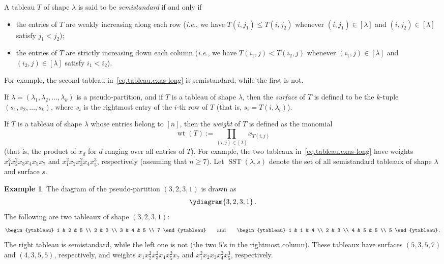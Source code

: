 \documentclass[reqno]{amsart}
\newcommand{\0}{\phantom{c}}
\newcommand{\diag}[1]{\left[#1\right]} %
\DeclareMathOperator{\wt}{wt} %
\DeclareMathOperator{\SST}{SST} %
\let\prodnonlimits\prod
\renewcommand{\prod}{\prodnonlimits\limits}
\newenvironment{verlong}{}{}
\newcommand{\tup}[1]{\left( #1 \right)}
\newcommand{\ive}[1]{\left[ #1 \right]}
\newcommand{\defn}[1]{{\color{darkred}\emph{#1}}} %
\theoremstyle{plain}
\theoremstyle{definition}
\newtheorem{example}[thm]{Example}
\numberwithin{equation}{section}
\begin{document}
A tableau $T$ of shape $\lambda$ is said to be \defn{semistandard} if and only if
\begin{itemize}
\item the entries of $T$ are weakly increasing along each row (\textit{i.e.}, we have $T(i,j_1) \leq T(i,j_2)$ whenever $(i,j_1) \in \diag{\lambda}$ and $(i,j_2) \in \diag{\lambda}$ satisfy $j_1 < j_2$);

\item the entries of $T$ are strictly increasing down each column (\textit{i.e.}, we have $T(i_1,j) < T(i_2,j)$ whenever $(i_1,j) \in \diag{\lambda}$ and $(i_2,j) \in \diag{\lambda}$ satisfy $i_1 < i_2$).
\end{itemize}

\begin{verlong}
For example, the second tableau in~\eqref{eq.tableau.exas-long} is semistandard, while the first is not.
\end{verlong}

If $\lambda = \tup{\lambda_1, \lambda_2, \dotsc, \lambda_k}$ is a pseudo-partition, and if $T$ is a tableau of shape $\lambda$,
then the \defn{surface} of $T$ is defined to be the $k$-tuple $(s_1, s_2, \dotsc, s_k)$, where $s_i$ is the rightmost entry of the $i$-th row of $T$ (that is, $s_i = T(i,\lambda_i)$).

If $T$ is a tableau of shape $\lambda$ whose entries belong to $\ive{n}$, then the \defn{weight} of $T$ is defined as the monomial
\[
\wt(T) := \prod_{(i,j) \in \diag{\lambda}} x_{T(i,j)}
\]
(that is, the product of $x_{d}$ for $d$ ranging over all entries of $T$).
\begin{verlong}
For example, the two tableaux in~\eqref{eq.tableau.exas-long} have weights $x_1^{3}x_2^{2}x_{3}x_{4}x_{5}x_{7}$ and $x_1^{2}x_2x_{3}^{2}x_{4}x_{5}^{3}$, respectively (assuming that $n \geq 7$).
\end{verlong}
Let $\SST(\lambda, s)$ denote the set of all semistandard tableaux of shape $\lambda$ and surface $s$.

\begin{example}
The diagram of the pseudo-partition $\tup{3,2,3,1}$ is drawn as
\[
\ydiagram{3,2,3,1}\,.
\]
The following are two tableaux of shape $\tup{3,2,3,1}$:
\[
\label{eq.tableau.exas}
\begin{ytableau} 1 & 2 & 5 \\ 2 & 3 \\ 3 & 4 & 5 \\ 7 \end{ytableau}\qquad
\text{and}\qquad
\begin{ytableau} 1 & 1 & 4 \\ 2 & 3 \\ 4 & 5 & 5 \\ 5 \end{ytableau}\,.
\]
The right tableau is semistandard, while the left one is not (the two $5$'s in the rightmost column).
These tableaux have surfaces $(5,3,5,7)$ and $(4,3,5,5)$, respectively, and weights $x_1 x_2^2 x_3^2 x_4 x_5^2 x_7$ and $x_1^2 x_2 x_3 x_4^2 x_5^3$, respectively.
\end{example}
\end{document}
